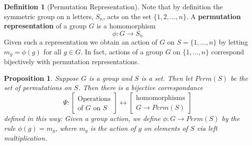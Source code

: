 \documentclass[12pt]{article}
\newtheorem{prop}[thm]{Proposition}
\theoremstyle{definition}
\newtheorem{defn}[thm]{Definition}
\theoremstyle{remark}
\numberwithin{equation}{section}
\newcommand\B[1]{\textbf{ #1}}
\begin{document}
\begin{defn}[Permutation Representation]
        Note that by definition the symmetric group on n letters, $S_n$, acts on the set $\{1,2,...,n\}$. A \B{permutation representation} of a group $G$ is a homomorphism \begin{equation}
                \phi: G\rightarrow S_n
        \end{equation}
        Given such a representation we obtain an action of $G$ on $S = \{1,...,n\}$ by letting $m_g = \phi(g)$ for all $g \in G$. In fact, actions of a group $G$ on $\{1,...,n\}$ correspond bijectively with permutation representations.
\end{defn}


\vspace{15pt}


\begin{prop}
        Suppose $G$ is a group and $S$ is a set. Then let $Perm(S)$ be the set of permutations on $S$. Then there is a bijective correspondance \begin{equation}
                \Psi: \begin{bmatrix} \text{Operations}\\\text{of $G$ on $S$}\end{bmatrix} \longleftrightarrow \begin{bmatrix} \text{homomorphisms}\\G\rightarrow Perm(S)\end{bmatrix}
        \end{equation}
        defined in this way: Given a group action, we define $\phi:G \rightarrow Perm(S)$ by the rule $\phi(g) = m_g$, where $m_g$ is the action of $g$ on elements of $S$ via left multiplication.
\end{prop}
\end{document}
